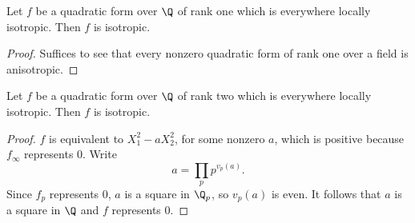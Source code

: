 \begin{lemma}\label{lem:isotr_of_rk_one}
	\leanok
	Let $f$ be a quadratic form over $\Q$ of rank one which is everywhere locally isotropic. Then $f$ is isotropic.
\end{lemma}
\begin{proof}
\leanok
Suffices to see that every nonzero quadratic form of rank one over a field is anisotropic.
\end{proof}

\begin{lemma}\label{lem:isotr_of_rk_two}
	\leanok
	Let $f$ be a quadratic form over $\Q$ of rank two which is everywhere locally isotropic. Then $f$ is isotropic.
\end{lemma}
\begin{proof}
\leanok
$f$ is equivalent to $X_1^2 - aX_2^2$, for some nonzero $a$, which is positive because $f_\infty$ represents $0$. Write
\[ a = \prod_p p^{v_p(a)}.\]
Since $f_p$ represents $0$, $a$ is a square in $\Q_p$, so $v_p(a)$ is even. It follows that $a$ is a square in $\Q$ and $f$ represents $0$.
\end{proof}

